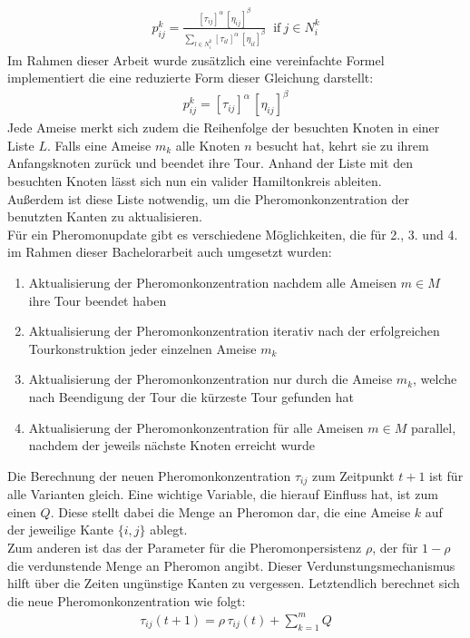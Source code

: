\documentclass[doktyp=barbeit, sprache=german]{TUBAFarbeiten}
\begin{document}
\begin{align}
\label{eq:Prob}
p^k_{ij} = \frac{[\tau_{ij}]^\alpha \, [\eta_{ij}]^\beta}{\sum\nolimits_{l\in N^k_i} [\tau_{il}]^\alpha \, [\eta_{il}]^\beta} \; \; \text{if}\: j \in N^k_i    
\end{align}
Im Rahmen dieser Arbeit wurde zusätzlich eine vereinfachte Formel  implementiert die eine reduzierte Form dieser Gleichung darstellt:
\begin{align}
\label{eq:ProbSimple}
p^k_{ij} = [\tau_{ij}]^\alpha \, [\eta_{ij}]^\beta
\end{align}
Jede Ameise merkt sich zudem die Reihenfolge der besuchten Knoten in einer Liste $L$. Falls eine Ameise $m_k$ alle Knoten $n$ besucht hat, kehrt sie zu ihrem Anfangsknoten zurück und beendet ihre Tour. Anhand der Liste mit den besuchten Knoten lässt sich nun ein valider Hamiltonkreis ableiten. 
\\Außerdem ist diese Liste notwendig, um die Pheromonkonzentration der benutzten Kanten zu aktualisieren.
\\Für ein Pheromonupdate gibt es verschiedene Möglichkeiten, die für 2., 3. und 4. im Rahmen dieser Bachelorarbeit auch umgesetzt wurden: 
\begin{enumerate}
\label{enum:Update}
\item Aktualisierung der Pheromonkonzentration nachdem alle Ameisen $m \in M$ ihre Tour beendet haben
\item Aktualisierung der Pheromonkonzentration iterativ nach der erfolgreichen Tourkonstruktion jeder einzelnen Ameise $m_k$
\item Aktualisierung der Pheromonkonzentration nur durch die Ameise $m_k$, welche nach Beendigung der Tour die kürzeste Tour gefunden hat
\item Aktualisierung der Pheromonkonzentration für alle Ameisen $m \in M$ parallel, nachdem der jeweils nächste Knoten erreicht wurde
\end{enumerate}
Die Berechnung der neuen Pheromonkonzentration $\tau_{ij}$ zum Zeitpunkt $t + 1$ ist für alle Varianten gleich. Eine wichtige Variable, die hierauf Einfluss hat, ist zum einen $Q$. Diese stellt dabei die Menge an Pheromon dar, die eine Ameise $k$ auf der jeweilige Kante $\{i,j\}$ ablegt. 
\\Zum anderen ist das der Parameter für die Pheromonpersistenz $\rho$, der für $1-\rho$ die verdunstende Menge an Pheromon angibt. Dieser Verdunstungsmechanismus hilft über die Zeiten ungünstige Kanten zu \glqq vergessen\grqq. Letztendlich berechnet sich die neue Pheromonkonzentration wie folgt:
\begin{align}
\label{eq:Pheromone}
\tau_{ij}(t+1) = \rho \, \tau_{ij}(t) + \sum_{k=1}^m Q
\end{align}
\end{document}
